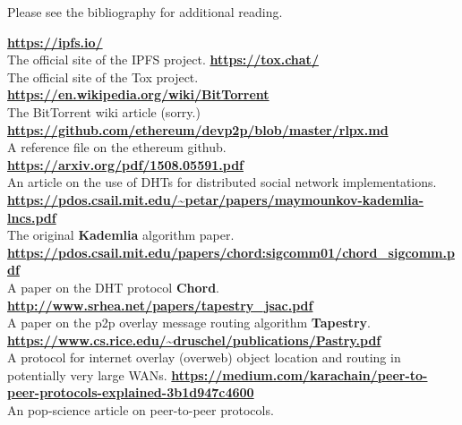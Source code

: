 \documentclass[12pt]{report}
\begin{document}
    Please see the bibliography for additional reading.
	
    \pagebreak




	\begin{thebibliography}{10}
            \textbf{\url{https://ipfs.io/}}\\
            The official site of the IPFS project.
            \textbf{\url{https://tox.chat/}}\\
            The official site of the Tox project.
            \textbf{\url{https://en.wikipedia.org/wiki/BitTorrent}}\\
            The BitTorrent wiki article (sorry.)
            \textbf{\url{https://github.com/ethereum/devp2p/blob/master/rlpx.md}}\\
            A reference file on the ethereum github.
            \textbf{\url{https://arxiv.org/pdf/1508.05591.pdf}}\\
            An article on the use of DHTs for distributed social network
            implementations.
		    \textbf{\url{https://pdos.csail.mit.edu/~petar/papers/maymounkov-kademlia-lncs.pdf}}\\
            The original \textbf{Kademlia} algorithm paper.
	    	\textbf{\url{https://pdos.csail.mit.edu/papers/chord:sigcomm01/chord_sigcomm.pdf}}\\
            A paper on the DHT protocol \textbf{Chord}.
	    	\textbf{\url{http://www.srhea.net/papers/tapestry_jsac.pdf}}\\
            A paper on the p2p overlay message routing algorithm \textbf{Tapestry}.
	    	\textbf{\url{https://www.cs.rice.edu/~druschel/publications/Pastry.pdf}}\\
            A protocol for internet overlay (overweb) object location and
            routing in potentially very large WANs.
	    	\textbf{\url{https://medium.com/karachain/peer-to-peer-protocols-explained-3b1d947c4600}}\\
            An pop-science article on peer-to-peer protocols.
	\end{thebibliography}
\end{document}
